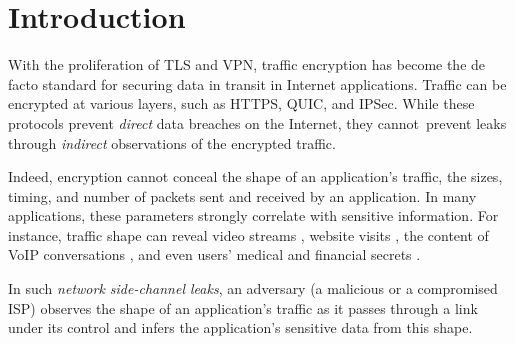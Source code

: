 \section{Introduction}
\label{sec:intro}

With the proliferation of TLS and VPN, traffic encryption has become the de
facto standard for securing data in transit in Internet applications. Traffic
can be encrypted at various layers, such as HTTPS, QUIC, and IPSec.
%
While these protocols prevent {\em direct} data breaches on the Internet, they
cannot~prevent leaks through {\em indirect} observations
of the encrypted traffic.

Indeed, encryption cannot conceal the shape of an
application’s traffic, \ie the sizes, timing, and number of packets sent
and received by an application. In many applications, these parameters strongly
correlate with sensitive information. For instance, %
traffic shape can reveal video
streams \cite{schuster2017beautyburst}, website visits
\cite{wang2014supersequence, bhat2019varcnn},
the content of VoIP conversations \cite{white2011phonotactic}, and
even users’ medical and financial secrets \cite{chen2010reality}.

In such {\em network side-channel leaks}, an adversary (\eg a malicious or
a compromised ISP) observes the shape of an application's traffic as it
passes through a link under its control and
infers the application's sensitive data from this shape.


